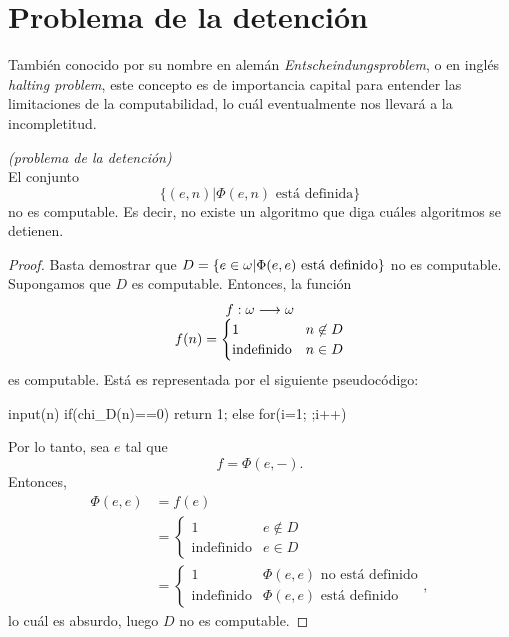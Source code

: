 \section{Problema de la detención}
\label{sec17}
También conocido por su nombre en alemán \textit{Entscheindungsproblem}, o en inglés \textit{halting problem}, este concepto es de importancia capital para entender las limitaciones de la computabilidad, lo cuál eventualmente nos llevará a la incompletitud.

\begin{thm} \textit{(problema de la detención)}\\
    El conjunto
    \[\{(e,n)|\Phi(e,n)\text{ está definida}\}\]
    no es computable. Es decir, no existe un algoritmo que diga cuáles algoritmos se detienen. 
\end{thm}
\begin{proof}
    Basta demostrar que $D=\{e\in\omega|\Phi(e,e)\text{ está definido}\}$ no es computable. Supongamos que $D$ es computable. Entonces, la función
    \[\begin{array}{c}
        f:\omega\longrightarrow\omega\\
        f(n)=\begin{cases}
            1 & n\not\in D \\
            \text{indefinido} & n\in D
        \end{cases}
    \end{array}\]
    es computable. Está es representada por el siguiente pseudocódigo:
    \begin{center}
    \begin{pseudocodigo}
        input(n)
        if(chi_D(n)==0)
            return 1;
        else 
            for(i=1; ;i++)
    \end{pseudocodigo}
    \end{center}
    Por lo tanto, sea $e$ tal que 
    \[f=\Phi(e,-).\]
    Entonces,
    \begin{align*}
        \Phi(e,e) &= f(e)\\
        &= \begin{cases}
            1 & e\not\in D \\
            \text{indefinido} & e\in D
        \end{cases}\\
        &=\begin{cases}
            1 & \Phi(e,e) \text{ no está definido} \\
            \text{indefinido} & \Phi(e,e)\text{ está definido}
        \end{cases},
    \end{align*}
    lo cuál es absurdo, luego $D$ no es computable.
\end{proof}

